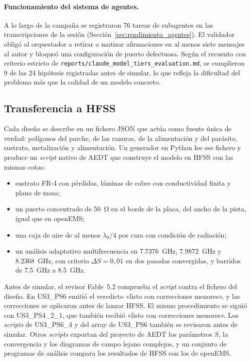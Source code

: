\documentclass[11pt,a4paper]{article}
\begin{document}
\paragraph{Funcionamiento del sistema de agentes.} A lo largo de la campaña se registraron 76 tareas de
subagentes en las transcripciones de la sesión (Sección~\ref{sec:rendimiento_agentes}). El validador obligó al orquestador a retirar o matizar afirmaciones en al menos siete
mensajes al autor y bloqueó una configuración de puerto defectuosa. Según el recuento con criterio estricto de \texttt{reports/claude\_model\_tiers\_evaluation.md}, se cumplieron 9 de las
24 hipótesis registradas antes de simular, lo que refleja la
dificultad del problema más que la calidad de un modelo concreto.

\subsection{Transferencia a HFSS}\label{sec:transferencia_hfss}
Cada diseño se describe en un fichero JSON que actúa como fuente única de verdad: polígonos del
parche, de las ranuras, de la alimentación y del parásito, sustrato, metalización y alimentación.
Un generador en Python lee ese fichero y produce un \textit{script} nativo de AEDT que construye
el modelo en HFSS con las mismas cotas:
\begin{itemize}
    \item sustrato FR-4 con pérdidas, láminas de cobre con conductividad finita y plano de masa;
    \item un puerto concentrado de \SI{50}{\ohm} en el borde de la placa, del ancho de la pista,
    igual que en openEMS;
    \item una caja de aire de al menos $\lambda_0/4$ por cara con condición de radiación;
    \item un análisis adaptativo multifrecuencia en \SI{7.7376}{GHz}, \SI{7.9872}{GHz} y
    \SI{8.2368}{GHz}, con criterio $\Delta S = 0{,}01$ en dos pasadas convergidas, y barridos de
    \SI{7.5}{GHz} a \SI{8.5}{GHz}.
\end{itemize}
Antes de simular, el revisor Fable~5.2 comprueba el \textit{script} contra el fichero del diseño. En US3\_PS6 emitió el veredicto «listo con correcciones menores», y las correcciones se aplicaron antes de lanzar HFSS. El mismo procedimiento se siguió con US3\_PS4\_2\_1, que también recibió «listo con correcciones menores». Los \textit{scripts} de US3\_PS6\_4 y del array de US3\_PS6 también se revisaron antes de simular. Otros \textit{scripts} exportan del proyecto de AEDT los parámetros $S$, la
convergencia y los diagramas de campo lejano complejos, y un conjunto de programas de análisis
compara los resultados de HFSS con los de openEMS.
\end{document}
